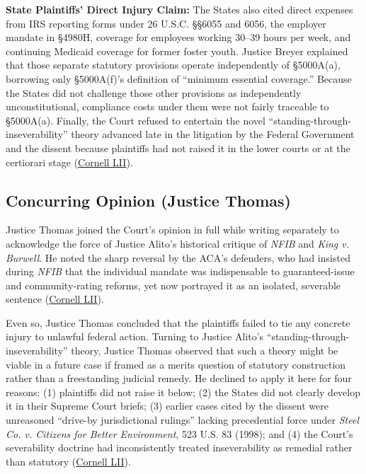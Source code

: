 \documentclass[12pt]{article}
\begin{document}
\textbf{State Plaintiffs' Direct Injury Claim:} The States also cited direct expenses from IRS reporting forms under 26 U.S.C. \S\S 6055 and 6056, the employer mandate in \S 4980H, coverage for employees working 30--39 hours per week, and continuing Medicaid coverage for former foster youth. Justice Breyer explained that those separate statutory provisions operate independently of \S 5000A(a), borrowing only \S 5000A(f)'s definition of ``minimum essential coverage.'' Because the States did not challenge those other provisions as independently unconstitutional, compliance costs under them were not fairly traceable to \S 5000A(a). Finally, the Court refused to entertain the novel ``standing-through-inseverability'' theory advanced late in the litigation by the Federal Government and the dissent because plaintiffs had not raised it in the lower courts or at the certiorari stage (\href{https://www.law.cornell.edu/supremecourt/text/19-840}{Cornell LII}).

\subsection{Concurring Opinion (Justice Thomas)}

Justice Thomas joined the Court's opinion in full while writing separately to acknowledge the force of Justice Alito's historical critique of \textit{NFIB} and \textit{King v. Burwell}. He noted the sharp reversal by the ACA's defenders, who had insisted during \textit{NFIB} that the individual mandate was indispensable to guaranteed-issue and community-rating reforms, yet now portrayed it as an isolated, severable sentence (\href{https://www.law.cornell.edu/supremecourt/text/19-840}{Cornell LII}).

Even so, Justice Thomas concluded that the plaintiffs failed to tie any concrete injury to unlawful federal action. Turning to Justice Alito's ``standing-through-inseverability'' theory, Justice Thomas observed that such a theory might be viable in a future case if framed as a merits question of statutory construction rather than a freestanding judicial remedy. He declined to apply it here for four reasons: (1) plaintiffs did not raise it below; (2) the States did not clearly develop it in their Supreme Court briefs; (3) earlier cases cited by the dissent were unreasoned ``drive-by jurisdictional rulings'' lacking precedential force under \textit{Steel Co. v. Citizens for Better Environment}, 523 U.S. 83 (1998); and (4) the Court's severability doctrine had inconsistently treated inseverability as remedial rather than statutory (\href{https://www.law.cornell.edu/supremecourt/text/19-840}{Cornell LII}).
\end{document}
